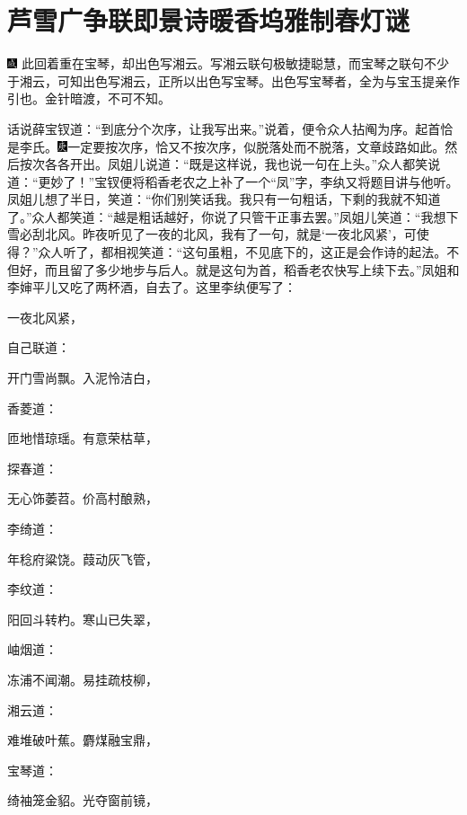 

\chapter{芦雪广争联即景诗\hspace{.5em}暖香坞雅制春灯谜}

{\includegraphics[width=3mm]{../Images/00005}  \kaishu 此回着重在宝琴，却出色写湘云。写湘云联句极敏捷聪慧，而宝琴之联句不少于湘云，可知出色写湘云，正所以出色写宝琴。出色写宝琴者，全为与宝玉提亲作引也。金针暗渡，不可不知。}

话说薛宝钗道：``到底分个次序，让我写出来。''说着，便令众人拈阄为序。起首恰是李氏。{\includegraphics[width=3mm]{../Images/00004}一定要按次序，恰又不按次序，似脱落处而不脱落，文章歧路如此。}然后按次各各开出。凤姐儿说道：``既是这样说，我也说一句在上头。''众人都笑说道：``更妙了！''宝钗便将稻香老农之上补了一个``凤''字，李纨又将题目讲与他听。凤姐儿想了半日，笑道：``你们别笑话我。我只有一句粗话，下剩的我就不知道了。''众人都笑道：``越是粗话越好，你说了只管干正事去罢。''凤姐儿笑道：``我想下雪必刮北风。昨夜听见了一夜的北风，我有了一句，就是`一夜北风紧'，可使得？''众人听了，都相视笑道：``这句虽粗，不见底下的，这正是会作诗的起法。不但好，而且留了多少地步与后人。就是这句为首，稻香老农快写上续下去。''凤姐和李婶平儿又吃了两杯酒，自去了。这里李纨便写了：

一夜北风紧，

自己联道：

开门雪尚飘。入泥怜洁白，

香菱道：

匝地惜琼瑶。有意荣枯草，

探春道：

无心饰萎苕。价高村酿熟，

李绮道：

年稔府粱饶。葭动灰飞管，

李纹道：

阳回斗转杓。寒山已失翠，

岫烟道：

冻浦不闻潮。易挂疏枝柳，

湘云道：

难堆破叶蕉。麝煤融宝鼎，

宝琴道：

绮袖笼金貂。光夺窗前镜，

